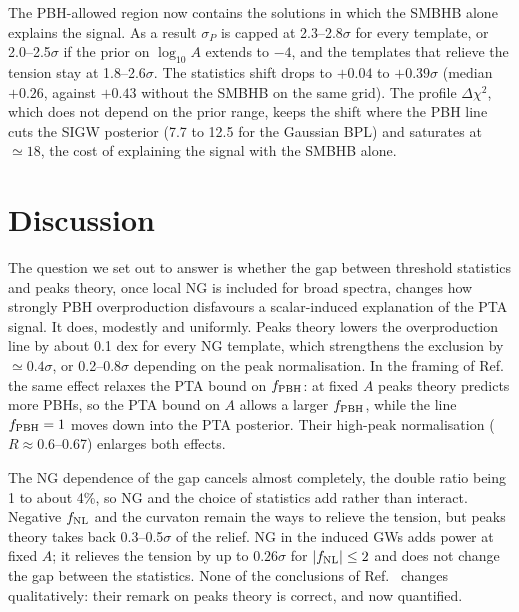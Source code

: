 \documentclass{article}
\newcommand{\fnl}{f_{\rm NL}}
\newcommand{\fpbh}{f_{\rm PBH}}
\begin{document}
The PBH-allowed region now contains the solutions in which the SMBHB alone explains the signal.
As a result $\sigma_P$ is capped at 2.3--2.8$\sigma$ for every template, or 2.0--2.5$\sigma$ if
the prior on $\log_{10}A$ extends to $-4$, and the templates that relieve the tension stay at
1.8--2.6$\sigma$. The statistics shift drops to $+0.04$ to $+0.39\sigma$ (median $+0.26$, against
$+0.43$ without the SMBHB on the same grid). The profile $\Delta\chi^2$, which does not depend on
the prior range, keeps the shift where the PBH line cuts the SIGW posterior (7.7 to 12.5 for the
Gaussian BPL) and saturates at $\simeq18$, the cost of explaining the signal with the SMBHB alone.

\section{Discussion}\label{sec:disc}

The question we set out to answer is whether the gap between threshold statistics and peaks
theory, once local NG is included for broad spectra, changes how strongly PBH overproduction
disfavours a scalar-induced explanation of the PTA signal. It does, modestly and uniformly. Peaks
theory lowers the overproduction line by about 0.1 dex for every NG template, which strengthens
the exclusion by $\simeq0.4\sigma$, or 0.2--0.8$\sigma$ depending on the peak normalisation. In the
framing of Ref.~\cite{Iovino24} the same effect relaxes the PTA bound on $\fpbh$: at fixed $A$
peaks theory predicts more PBHs, so the PTA bound on $A$ allows a larger $\fpbh$, while the line
$\fpbh=1$ moves down into the PTA posterior. Their high-peak normalisation ($R\approx0.6$--0.67)
enlarges both effects.

The NG dependence of the gap cancels almost completely, the double ratio being 1 to about 4\%, so
NG and the choice of statistics add rather than interact. Negative $\fnl$ and the curvaton remain
the ways to relieve the tension, but peaks theory takes back 0.3--0.5$\sigma$ of the relief. NG in
the induced GWs adds power at fixed $A$; it relieves the tension by up to $0.26\sigma$ for
$|\fnl|\le2$ and does not change the gap between the statistics. None of the conclusions of
Ref.~\cite{FIVT23} changes qualitatively: their remark on peaks theory is correct, and now
quantified.
\end{document}
